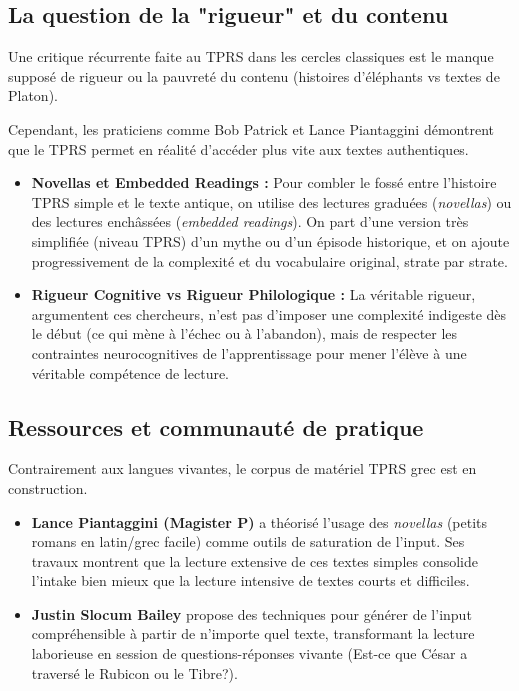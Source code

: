 \subsection{La question de la "rigueur" et du contenu}

Une critique récurrente faite au TPRS dans les cercles classiques est le manque supposé de \og
rigueur\fg{} ou la pauvreté du contenu (histoires d'éléphants vs textes de Platon).

Cependant, les praticiens comme Bob Patrick et Lance Piantaggini démontrent que le TPRS permet en
réalité d'accéder plus vite aux textes authentiques.

\begin{itemize}\item \textbf{Novellas et \og Embedded Readings\fg{} :} Pour combler le fossé entre l'histoire TPRS simple et le texte antique, on utilise des lectures graduées (\textit{novellas}) ou des lectures \og enchâssées\fg{} (\textit{embedded readings}). On part d'une version très simplifiée (niveau TPRS) d'un mythe ou d'un épisode historique, et on ajoute progressivement de la complexité et du vocabulaire original, strate par strate.\cite{III-2-3-ref20}\item \textbf{Rigueur Cognitive vs Rigueur Philologique :} La véritable rigueur, argumentent ces chercheurs, n'est pas d'imposer une complexité indigeste dès le début (ce qui mène à l'échec ou à l'abandon), mais de respecter les contraintes neurocognitives de l'apprentissage pour mener l'élève à une véritable compétence de lecture.\cite{III-2-3-ref26}\end{itemize}

\subsection{Ressources et communauté de pratique}

Contrairement aux langues vivantes, le corpus de matériel TPRS grec est en construction.

\begin{itemize}\item \textbf{Lance Piantaggini (Magister P)} a théorisé l'usage des \textit{novellas} (petits romans en latin/grec facile) comme outils de saturation de l'input. Ses travaux montrent que la lecture extensive de ces textes simples consolide l'intake bien mieux que la lecture intensive de textes courts et difficiles.\cite{III-2-3-ref20}\item \textbf{Justin Slocum Bailey} propose des techniques pour générer de l'input compréhensible à partir de n'importe quel texte, transformant la lecture laborieuse en session de questions-réponses vivante (\og Est-ce que César a traversé le Rubicon ou le Tibre?\fg{}).\cite{III-2-3-ref24}\end{itemize}

